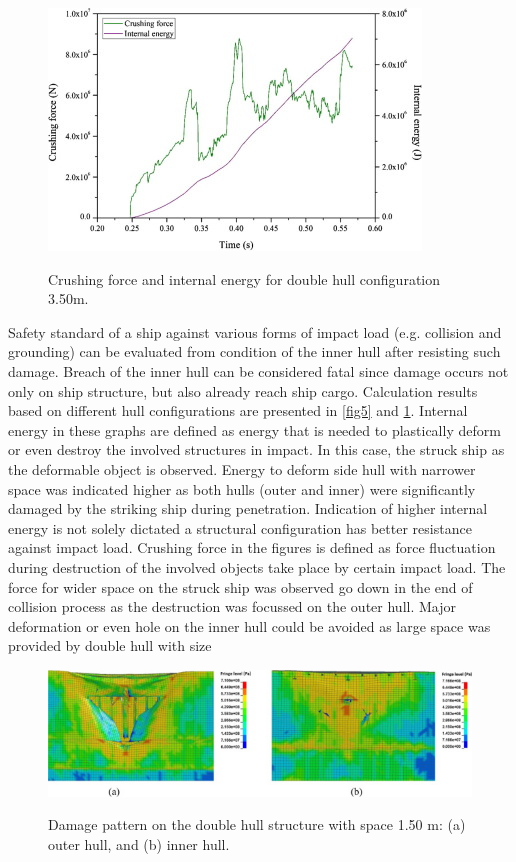 \documentclass[../Final.tex]{subfiles}
\begin{document}
\begin{figure}[ht]
    \centering
    \includegraphics[width=\columnwidth]{fig6.jpg}
    \label{fig6}
    \caption{Crushing force and internal energy for double hull configuration 3.50m.}
\end{figure}

Safety standard of a ship against various forms of impact load (e.g. collision and grounding) can be evaluated from condition of the inner hull after resisting such damage. 
Breach of the inner hull can be considered fatal since damage occurs not only on ship structure, but also already reach ship cargo. Calculation results based on different hull configurations are presented in \ref{fig5} and \ref{fig6}. 
Internal energy in these graphs are defined as energy that is needed to plastically deform or even destroy the involved structures in impact. 
In this case, the struck ship as the deformable object is observed. Energy to deform side hull with narrower space was indicated higher as both hulls (outer and inner) were significantly damaged by the striking ship during penetration. 
Indication of higher internal energy is not solely dictated a structural configuration has better resistance against impact load. 
Crushing force in the figures is defined as force fluctuation during destruction of the involved objects take place by certain impact load. 
The force for wider space on the struck ship was observed go down in the end of collision process as the destruction was focussed on the outer hull. Major deformation or even hole on the inner hull could be 
avoided as large space was provided by double hull with size

\begin{figure}[ht]
    \centering
    \includegraphics[width=\columnwidth]{fig7.jpg}
    \label{fig7}
    \caption{Damage pattern on the double hull structure with space 1.50 m: (a) outer hull, and (b) inner hull.}
\end{figure}
\end{document}
